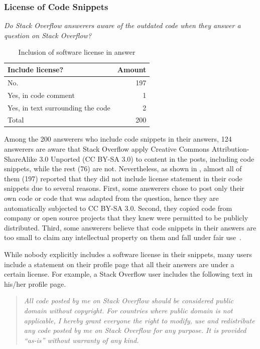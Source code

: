 \documentclass[10pt,journal,compsoc]{IEEEtran}
\begin{document}
\subsubsection{License of Code Snippets} 
\vspace{0.25cm}
\textit{Do Stack Overflow
	answerers aware of the outdated code when
	they answer a question on Stack Overflow?} 
\vspace{0.25cm}

\begin{table}
	\centering
	\caption{Inclusion of software license in answer}
	\label{tab:survey_license_include}
	\begin{tabular}{lr}
		\toprule
		Include license? & Amount \\
		\midrule
		No. & 197 \\
		Yes, in code comment &	1 \\
		Yes, in text surrounding the code & 2 \\
		\midrule
		Total & 200 \\
		\bottomrule
	\end{tabular}
\end{table}

Among the 200 answerers who include code snippets in their answers, 124
answerers are aware that Stack Overflow apply Creative Commons
Attribution-ShareAlike 3.0 Unported (CC BY-SA 3.0) to content in the posts,
including code snippets, while the rest (76) are not. Nevertheless, as shown in
, almost all of them (197) reported that they
did not include license statement in their code snippets due to several reasons.
First, some answerers chose to post only their own code or code that was adapted
from the question, hence they are automatically subjected to CC BY-SA 3.0.
Second, they copied code from company or open source projects that they knew
were permitted to be publicly distributed. Third, some answerers believe that
code snippets in their answers are too small to claim any intellectual property
on them and fall under fair use~\cite{fairuse}.

While nobody explicitly includes a software license in their snippets,
many users include a statement on their profile page that all their
answers are under a certain license. For example, a Stack Overflow user includes 
the following text in his/her profile page.

\begin{quotation}
\textit{All code posted by me on
	Stack Overflow should be considered public domain without copyright. For
	countries where public domain is not applicable, I hereby grant everyone the
	right to modify, use and redistribute any code posted by me on Stack Overflow
	for any purpose. It is provided ``as-is'' without warranty of any kind.}
\end{quotation}
\end{document}
